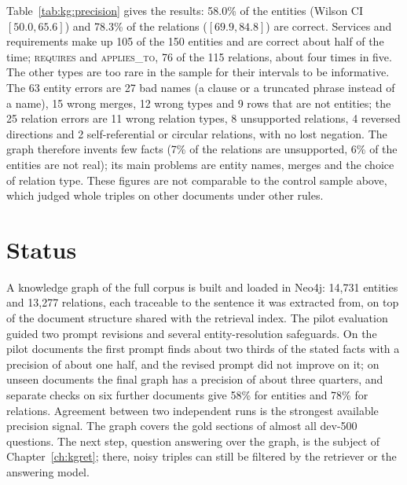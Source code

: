 Table~\ref{tab:kg:precision} gives the results: 58.0\% of the entities (Wilson CI
$[50.0, 65.6]$) and 78.3\% of the relations ($[69.9, 84.8]$) are correct. Services and
requirements make up 105 of the 150 entities and are correct about half of the time;
\textsc{requires} and \textsc{applies\_to}, 76 of the 115 relations, about four times in
five. The other types are too rare in the sample for their intervals to be informative.
The 63 entity errors are 27 bad names (a clause or a truncated phrase instead of a
name), 15 wrong merges, 12 wrong types and 9 rows that are not entities; the 25
relation errors are 11 wrong relation types, 8 unsupported relations, 4 reversed
directions and 2 self-referential or circular relations, with no lost negation. The
graph therefore invents few facts (7\% of the relations are unsupported, 6\% of the
entities are not real); its main problems are entity names, merges and the choice of
relation type. These figures are not comparable to the control sample above, which
judged whole triples on other documents under other rules.


\section{Status}\label{sec:kg:status}

A knowledge graph of the full corpus is built and loaded in Neo4j: 14{,}731 entities and
13{,}277 relations, each traceable to the sentence it was extracted from, on top of the
document structure shared with the retrieval index. The pilot evaluation guided two
prompt revisions and several entity-resolution safeguards. On the pilot documents the
first prompt finds about two thirds of the stated facts with a precision of about one
half, and the revised prompt did not improve on it; on unseen documents the final graph
has a precision of about three quarters, and separate checks on six further documents give 58\% for entities and 78\% for relations. Agreement between two independent runs is the
strongest available precision signal. The graph covers the gold sections of almost all dev-500 questions. The next
step, question answering over the graph, is the subject of Chapter~\ref{ch:kgret};
there, noisy triples can still be filtered by the retriever or the answering model.

